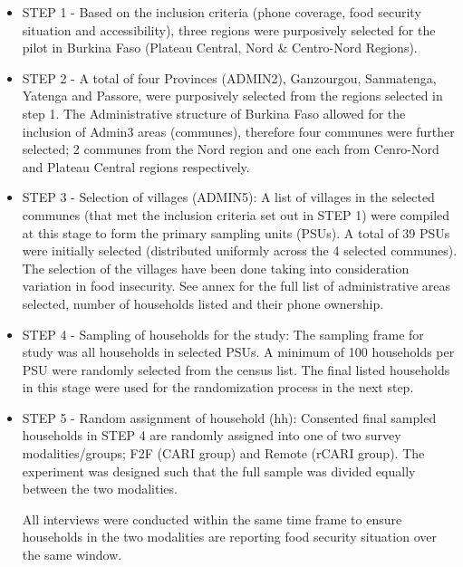 \documentclass[11pt,harvard]{article}
\begin{document}
	\begin{itemize}[label=--, left=1.5em]
		\item[1.] STEP 1 - Based on the inclusion criteria (phone coverage, food security situation and accessibility), three regions were purposively selected for the pilot in Burkina Faso (Plateau Central, Nord \& Centro-Nord Regions). 
		
		\item[2.] STEP 2 - A total of four Provinces (ADMIN2), Ganzourgou, Sanmatenga, Yatenga and Passore, were purposively selected from the regions selected in step 1. The Administrative structure of Burkina Faso allowed for the inclusion of Admin3 areas (communes), therefore four communes were further selected; 2 communes from the Nord region and one each from Cenro-Nord and Plateau Central regions respectively. 
		
		\item[3.] STEP 3 - Selection of villages (ADMIN5): A list of villages in the selected communes (that met the inclusion criteria set out in STEP 1) were compiled at this stage to form the primary sampling units (PSUs). A total of 39 PSUs were initially selected (distributed uniformly across the 4 selected communes). The selection of the villages have been done taking into consideration variation in food insecurity. See annex for the full list of administrative areas selected, number of households listed and their phone ownership.
		
		\item[4.] STEP 4 - Sampling of households for the study: The sampling frame for study was all households in selected PSUs. A minimum of 100 households per PSU were randomly selected from the census list. The final listed households in this stage were used for the randomization process in the next step.
		
		\item[5.] STEP 5 - Random assignment of household (hh): Consented final sampled households in STEP 4 are randomly assigned into one of two survey modalities/groups; F2F (CARI group) and Remote (rCARI group). The experiment was designed such that the full sample was divided equally between the two modalities.
	
		All interviews were conducted within the same time frame to ensure households in the two modalities are reporting food security situation over the same window. 
	\end{itemize}
	
	
	\pagebreak
	
\end{document}
